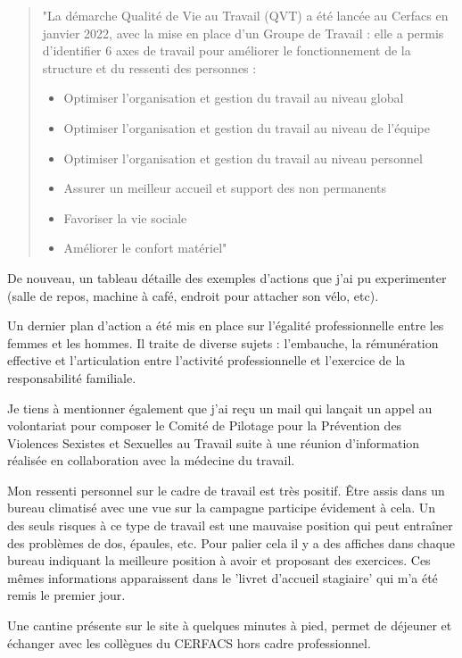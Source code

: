     \begin{quote}
        \setlength{\leftmargin}{0.5cm} %
        \setlength{\rightmargin}{0.5cm} %
        "La démarche Qualité de Vie au Travail (QVT) a été lancée au Cerfacs en janvier 2022, avec la mise en
        place d’un Groupe de Travail : elle a permis d’identifier 6 axes de travail pour améliorer le
        fonctionnement de la structure et du ressenti des personnes :
        \begin{itemize}
            \item Optimiser l’organisation et gestion du travail au niveau global
            \item Optimiser l’organisation et gestion du travail au niveau de l’équipe
            \item Optimiser l’organisation et gestion du travail au niveau personnel
            \item Assurer un meilleur accueil et support des non permanents
            \item Favoriser la vie sociale
            \item Améliorer le confort matériel"
        \end{itemize}
    \end{quote}

    De nouveau, un tableau  détaille des exemples d'actions que j'ai pu experimenter (salle de repos, machine à café, endroit pour attacher son vélo, etc).

    Un dernier plan d'action a été mis en place sur l'égalité professionnelle entre les femmes et les hommes. Il traite de diverse sujets : l’embauche, la rémunération effective et l’articulation entre l’activité professionnelle et l’exercice de la responsabilité familiale.

    Je tiens à mentionner également que j'ai reçu un mail qui lançait un appel au volontariat pour composer le Comité de Pilotage pour la Prévention des Violences Sexistes et Sexuelles au Travail suite à une réunion d'information réalisée en collaboration avec la médecine du travail.


Mon ressenti personnel sur le cadre de travail est très positif. Être assis dans un bureau climatisé avec une vue sur la campagne participe évidement à cela. Un des seuls risques à ce type de travail est une mauvaise position qui peut entraîner des problèmes de dos, épaules, etc. Pour palier cela il y a des affiches dans chaque bureau indiquant la meilleure position à avoir et proposant des exercices. Ces mêmes informations apparaissent dans le 'livret d'accueil stagiaire' qui m'a été remis le premier jour.

Une cantine présente sur le site à quelques minutes à pied, permet de déjeuner et échanger avec les collègues du CERFACS hors cadre professionnel.